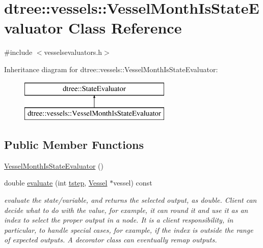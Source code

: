 \hypertarget{classdtree_1_1vessels_1_1_vessel_month_is_state_evaluator}{}\section{dtree\+::vessels\+::Vessel\+Month\+Is\+State\+Evaluator Class Reference}
\label{classdtree_1_1vessels_1_1_vessel_month_is_state_evaluator}


{\ttfamily \#include $<$vesselsevaluators.\+h$>$}

Inheritance diagram for dtree\+::vessels\+::Vessel\+Month\+Is\+State\+Evaluator\+:\begin{figure}[H]
\begin{center}
\leavevmode
\includegraphics[height=2.000000cm]{d0/dd2/classdtree_1_1vessels_1_1_vessel_month_is_state_evaluator}
\end{center}
\end{figure}
\subsection*{Public Member Functions}
\begin{DoxyCompactItemize}
\item 
\mbox{\hyperlink{classdtree_1_1vessels_1_1_vessel_month_is_state_evaluator_a779c71e69e53b59a7841783c2835cd21}{Vessel\+Month\+Is\+State\+Evaluator}} ()
\item 
double \mbox{\hyperlink{classdtree_1_1vessels_1_1_vessel_month_is_state_evaluator_aec699917282c6c3cc1811b5c4e8238e9}{evaluate}} (int \mbox{\hyperlink{thread__vessels_8cpp_a84bc73d278de929ec9974e1a95d9b23a}{tstep}}, \mbox{\hyperlink{class_vessel}{Vessel}} $\ast$vessel) const
\begin{DoxyCompactList}\small\item\em evaluate the state/variable, and returns the selected output, as double. Client can decide what to do with the value, for example, it can round it and use it as an index to select the proper output in a node. It is a client responsibility, in particular, to handle special cases, for example, if the index is outside the range of expected outputs. A decorator class can eventually remap outputs. \end{DoxyCompactList}\end{DoxyCompactItemize}


